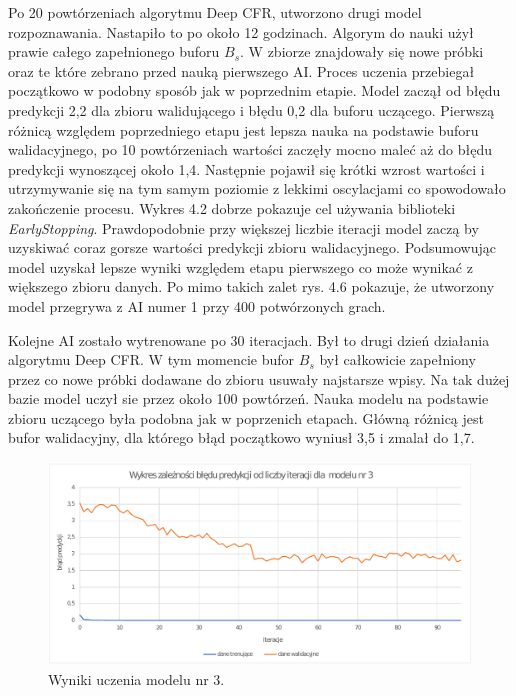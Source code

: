 \documentclass[12pt,oneside,a4paper]{report}
\begin{document}
\newpage
Po 20 powtórzeniach algorytmu Deep CFR, utworzono drugi model rozpoznawania. 
Nastapiło to po około 12 godzinach. Algorym do nauki użył prawie całego zapełnionego buforu $B_{s}$.
W zbiorze znajdowały się nowe próbki oraz te które zebrano przed nauką pierwszego AI.
Proces uczenia przebiegał początkowo w podobny sposób jak w poprzednim etapie. Model zaczął od błędu
predykcji 2,2 dla zbioru walidującego i błędu 0,2 dla buforu uczącego. Pierwszą różnicą względem 
poprzedniego etapu jest lepsza nauka na podstawie buforu walidacyjnego, po 10
powtórzeniach wartości zaczęły mocno
maleć aż do błędu predykcji wynoszącej około 1,4. Następnie pojawił się krótki wzrost wartości i
utrzymywanie się
na tym samym poziomie z lekkimi oscylacjami co spowodowało 
zakończenie procesu. Wykres 4.2 dobrze pokazuje cel używania biblioteki \emph{EarlyStopping}.
Prawdopodobnie przy większej liczbie iteracji model zaczą by uzyskiwać coraz gorsze wartości
predykcji zbioru walidacyjnego. Podsumowując model uzyskał lepsze wyniki względem etapu pierwszego
co może wynikać z większego zbioru danych. Po mimo takich zalet rys. 4.6 pokazuje, że utworzony
model przegrywa z AI numer 1 przy 400 potwórzonych grach.

Kolejne AI zostało wytrenowane po 30 iteracjach. Był to drugi dzień działania algorytmu
Deep
CFR. W tym momencie bufor $B_{s}$ był całkowicie zapełniony przez co
nowe próbki dodawane do zbioru usuwały najstarsze wpisy. Na tak dużej bazie model uczył sie 
przez około 100
powtórzeń. Nauka modelu na podstawie zbioru uczącego była podobna jak w poprzenich etapach. Główną
różnicą jest bufor walidacyjny, dla którego błąd początkowo wyniusł 3,5 i zmalał do 1,7. 

\vspace{0.5cm}

\begin{figure}[!ht]
  \centering
  \includegraphics[width=1\textwidth]{./img/model3.pdf}
\caption{Wyniki uczenia modelu nr 3.}
\end{figure}
\end{document}
